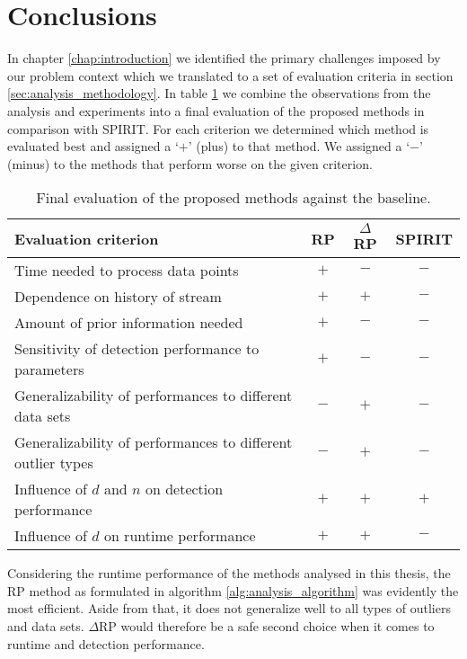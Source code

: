 \section{Conclusions}
\label{sec:discussion_conclusions}

In chapter \ref{chap:introduction} we identified the primary challenges imposed by our problem context which we translated to a set of evaluation criteria in section \ref{sec:analysis_methodology}. In table \ref{tab:conclusion_qualcomp} we combine the observations from the analysis and experiments into a final evaluation of the proposed methods in comparison with SPIRIT. For each criterion we determined which method is evaluated best and assigned a `$+$' (plus) to that method. We assigned a `$-$' (minus) to the methods that perform worse on the given criterion. 

\begin{table}[h]
	\centering
	\vspace{0.05cm}
	\caption{Final evaluation of the proposed methods against the baseline.}
	\label{tab:conclusion_qualcomp}
	\begin{tabular}{l c c c}
		\toprule
		\textbf{Evaluation criterion} 		& \textbf{RP} 	& \textbf{$\Delta$RP} & \textbf{SPIRIT} \\ \midrule
		Time needed to process data points 	&  		$+$		&  		$-$		& $-$ \\[0.12cm]
		Dependence on history of stream 	& 		$+$		& 		$+$		& $-$ \\[0.12cm]
		Amount of prior information needed 	& 		$+$		& 		$-$		& $-$ \\[0.12cm]
		Sensitivity of detection performance to parameters			&	$+$ 	& 	$-$	& $-$ \\
		\midrule
		Generalizability of performances to different data sets & $-$ & $+$ & $-$\\[0.12cm]
		Generalizability of performances to different outlier types	& $-$	& $+$	& $-$\\
		\midrule
		Influence of $d$ and $n$ on detection performance		& $+$ & $+$ & $+$ \\[0.12cm]
		Influence of $d$ on runtime performance		& $+$ & $+$ & $-$ \\
		\bottomrule		
	\end{tabular}
	\vspace{0.05cm}
\end{table}

Considering the runtime performance of the methods analysed in this thesis, the RP method as formulated in algorithm \ref{alg:analysis_algorithm} was evidently the most efficient. Aside from that, it does not generalize well to all types of outliers and data sets. $\Delta$RP would therefore be a safe second choice when it comes to runtime and detection performance. 

